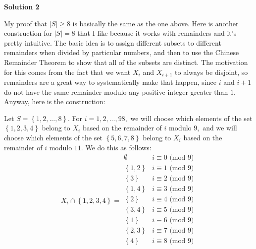 \begin{enumerate}
 



\textbf{Solution 2}

My proof that $|S|\ge 8$ is basically the same as the one above. Here is another construction for $|S| = 8$ that I like because it works with remainders and it's pretty intuitive. The basic idea is to assign different subsets to different remainders when divided by particular numbers, and then to use the Chinese Remainder Theorem to show that all of the subsets are distinct. The motivation for this comes from the fact that we want $X_i$ and $X_{i+1}$ to always be disjoint, so remainders are a great way to systematically make that happen, since $i$ and $i+1$ do not have the same remainder modulo any positive integer greater than $1.$ Anyway, here is the construction:

 Let $S = \left\{ {1, 2, ..., 8} \right\}.$ For $i = 1, 2, ..., 98,$ we will choose which elements of the set $\left\{ {1, 2, 3, 4} \right\}$ belong to $X_i$ based on the remainder of $i$ modulo $9,$ and we will choose which elements of the set $\left\{ {5, 6, 7, 8} \right\}$ belong to $X_i$ based on the remainder of $i$ modulo $11.$ We do this as follows:
 \[X_i\cap\left\{ {1, 2, 3, 4} \right\} = \begin{array}{ll}       \emptyset & i\equiv 0 \text{ (mod } 9\text{)} \\       \left\{ {1, 2} \right\} & i\equiv 1 \text{ (mod } 9\text{)} \\       \left\{ {3} \right\} & i\equiv 2 \text{ (mod } 9\text{)} \\       \left\{ {1, 4} \right\} & i\equiv 3 \text{ (mod } 9\text{)} \\       \left\{ {2} \right\} & i\equiv 4 \text{ (mod } 9\text{)} \\       \left\{ {3, 4} \right\} & i\equiv 5 \text{ (mod } 9\text{)} \\       \left\{ {1} \right\} & i\equiv 6 \text{ (mod } 9\text{)} \\       \left\{ {2, 3} \right\} & i\equiv 7 \text{ (mod } 9\text{)} \\       \left\{ {4} \right\} & i\equiv 8 \text{ (mod } 9\text{)} \\ \end{array}\]

\end{enumerate}
